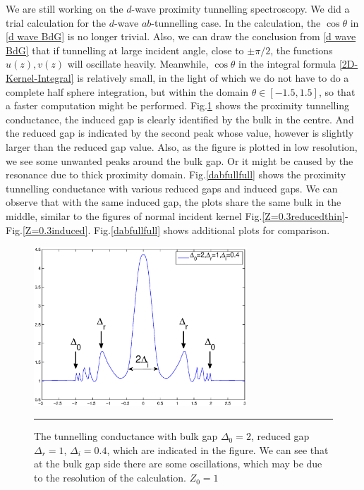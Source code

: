 We are still working on the $d$-wave proximity tunnelling spectroscopy. We did a trial calculation for the $d$-wave $ab$-tunnelling case. In the calculation, the $\cos\theta$ in \eqref{d wave BdG} is no longer trivial. Also, we can draw the conclusion from \eqref{d wave BdG} that if tunnelling at large incident angle, close to $\pm\pi/2$, the functions $u(z),v(z)$ will oscillate heavily. Meanwhile, $\cos\theta$ in the integral formula \eqref{2D-Kernel-Integral} is relatively small, in the light of which we do not have to do a complete half sphere integration, but within the domain $\theta\in[-1.5,1.5]$, so that a faster computation might be performed.
Fig.\ref{dabfull2-1-0.4} shows the proximity tunnelling conductance, the induced gap is clearly identified by the bulk in the centre. And the reduced gap is indicated by the second peak whose value, however is slightly larger than the reduced gap value. Also, as the figure is plotted in low resolution, we see some unwanted peaks around the bulk gap. Or it might be caused by the resonance due to thick proximity domain.  Fig.\ref{dabfullfull} shows the proximity tunnelling conductance with various reduced gaps and induced gaps. We can observe that with the same induced gap, the plots share the same bulk in the middle, similar to the figures of normal incident kernel Fig.\ref{Z=0.3reducedthin}-Fig.\ref{Z=0.3induced}. Fig.\ref{dabfullfull} shows additional plots for comparison.
\begin{figure}[htbp]
\small
	\centering
		\includegraphics[width=8cm]{./Figures/fulldab2104.eps}
		\rule{35em}{0.5pt}
	\caption[An Electron]{The tunnelling conductance with bulk gap $\Delta_0=2$, reduced gap $\Delta_r=1$, $\Delta_i=0.4$, which are indicated in the figure. We can see that at the bulk gap side there are some oscillations, which may be due to the resolution of the calculation. $Z_0=1$}
	\label{dabfull2-1-0.4}
\end{figure}
